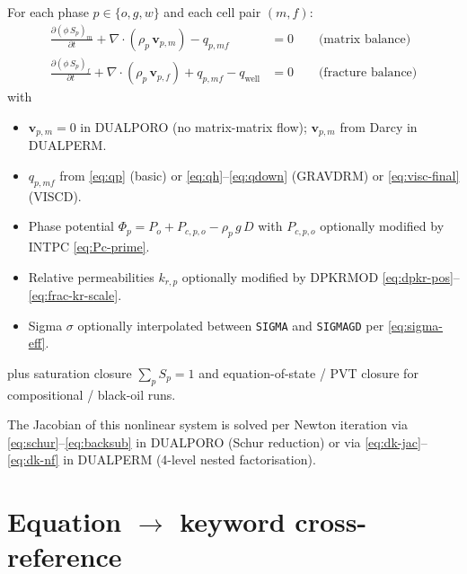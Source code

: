 \documentclass[11pt,a4paper]{article}
\newcommand{\kw}[1]{\texttt{#1}}
\begin{document}
For each phase $p \in \{o,g,w\}$ and each cell pair $(m,f)$:
\begin{align}
\frac{\partial(\phi\,S_p)_m}{\partial t}
  + \nabla\!\cdot\!(\rho_p\,\mathbf{v}_{p,m}) - q_{p,mf} &= 0
\qquad\text{(matrix balance)} \label{eq:mass-m}\\[2pt]
\frac{\partial(\phi\,S_p)_f}{\partial t}
  + \nabla\!\cdot\!(\rho_p\,\mathbf{v}_{p,f}) + q_{p,mf} - q_{\text{well}} &= 0
\qquad\text{(fracture balance)} \label{eq:mass-f}
\end{align}
with
\begin{itemize}
  \item $\mathbf{v}_{p,m} = 0$ in DUALPORO (no matrix-matrix flow); $\mathbf{v}_{p,m}$ from Darcy in DUALPERM.
  \item $q_{p,mf}$ from \eqref{eq:qp} (basic) or \eqref{eq:qh}--\eqref{eq:qdown} (GRAVDRM) or \eqref{eq:visc-final} (VISCD).
  \item Phase potential $\Phi_p = P_o + P_{c,p,o} - \rho_p\,g\,D$ with $P_{c,p,o}$ optionally modified by INTPC \eqref{eq:Pc-prime}.
  \item Relative permeabilities $k_{r,p}$ optionally modified by DPKRMOD \eqref{eq:dpkr-pos}--\eqref{eq:frac-kr-scale}.
  \item Sigma $\sigma$ optionally interpolated between \kw{SIGMA} and \kw{SIGMAGD} per \eqref{eq:sigma-eff}.
\end{itemize}
plus saturation closure $\sum_p S_p = 1$ and equation-of-state / PVT closure for compositional / black-oil runs.

The Jacobian of this nonlinear system is solved per Newton iteration via \eqref{eq:schur}--\eqref{eq:backsub}
in DUALPORO (Schur reduction) or via \eqref{eq:dk-jac}--\eqref{eq:dk-nf} in DUALPERM (4-level nested factorisation).

\section{Equation $\to$ keyword cross-reference}
\end{document}
